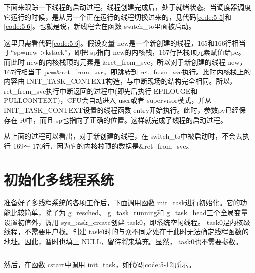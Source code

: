 \documentclass[main.tex]{subfiles}
\begin{document}
\begin{CJK*}{UTF8}{song}
\par
下面来跟踪一下线程的启动过程。线程创建完成后，处于就绪状态。当调度器调度它运行的时候，是从另一个正在运行的线程切换过来的，见代码\ref{code:5-5}和\ref{code:5-6}。也就是说，新线程会在函数 switch\_\-to里面被启动。

\par
这里只需看代码\ref{code:5-6}。假设变量 new是一个新创建的线程，165和166行相当于“sp=new-\textgreater kstack”，即把 sp指向 new的内核栈，167行把栈顶元素赋值给pc。而此时 new的内核栈顶的元素是  \&ret\_\-from\_\-svc，所以对于新创建的线程 new，167行相当于 pc=\&ret\_\-from\_\-svc，即跳转到 ret\_\-from\_\-svc执行。此时内核栈上的内容由  INIT\_\-TASK\_\-CONTEXT构造，与中断现场的结构完全相同。所以，  ret\_\-from\_\-svc执行中断返回的过程中(即先后执行 EPILOUGE和  PULL\-CONTEXT)，CPU会自动进入 user或者 supervisor模式，并从  INIT\_\-TASK\_\-CONTEXT设置的线程函数  entry开始执行。此时，参数pv已经保存在 r0中，而且 sp也指向了正确的位置。这样就完成了线程的启动过程。

\par
从上面的过程可以看出，对于新创建的线程，在 switch\_\-to中被启动时，不会去执行 169～ 170行，因为它的内核栈顶的数据是\&ret\_\-from\_\-svc。

\section{初始化多线程系统}
准备好了多线程系统的各项工作后，下面调用函数 init\_\-task进行初始化。它的功能比较简单，除了为 g\_\-resched、 g\_\-task\_\-running和 g\_\-task\_\-head三个全局变量设置初值外，调用 sys\_\-task\_\-create创建 task0，即系统空闲线程。 task0是内核级线程，不需要用户栈。创建 task0时的与众不同之处在于此时无法确定线程函数的地址。因此，暂时也填上 NULL，留待将来填充。显然， task0也不需要参数。

\begin{code}
\label{code:5-11}
\inputminted[firstline=290,lastline=306,linenos,numbersep=5pt,frame=lines,framesep=2mm]{c}{src/chapter05/kernel/task.c}
\end{code}

\noindent
然后，在函数 cstart中调用 init\_\-task，如代码\ref{code:5-12}所示。

\begin{code}
\label{code:5-12}
\inputminted[firstline=491,lastline=502,linenos,numbersep=5pt,frame=lines,framesep=2mm]{c}{src/chapter05/kernel/machdep.c}
\end{code}


\end{CJK*}
\end{document}
